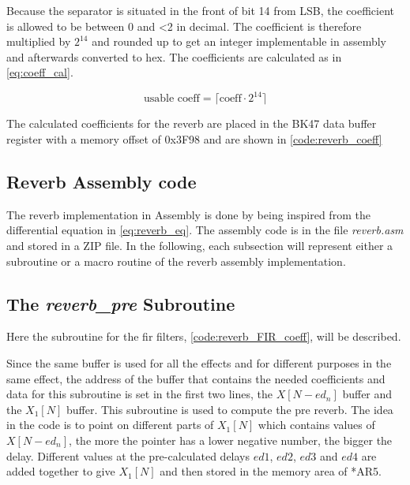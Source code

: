 Because the separator is situated in the front of bit 14 from LSB, the coefficient is allowed to be between 0 and <2 in decimal. The coefficient is therefore multiplied by $2^{14}$ and rounded up to get an integer implementable in assembly and afterwards converted to hex. The coefficients are calculated as in \autoref{eq:coeff_cal}.

    \begin{equation}\label{eq:coeff_cal}
\text{usable coeff} = \lceil\text{coeff} \cdot 2^{14}\rceil
    \end{equation}

The calculated coefficients for the \gls{reverb} are placed in the BK47 data buffer register with a memory offset of 0x3F98 and are shown in \autoref{code:reverb_coeff}



\subsection{Reverb Assembly code}
The reverb implementation in Assembly is done by being inspired from the differential equation in \autoref{eq:reverb_eq}. The assembly code is in the file \textit{reverb.asm} and stored in a ZIP file. In the following, each subsection will represent either a subroutine or a macro routine of the reverb assembly implementation. 

\subsection{The \textit{reverb_pre} Subroutine}
Here the subroutine for the \gls{fir} filters, \autoref{code:reverb_FIR_coeff}, will be described.


Since the same buffer is used for all the effects and for different purposes in the same effect, the address of the buffer that contains the needed coefficients and data for this subroutine is set in the first two lines, the $X[N-ed_{n}]$ buffer and the $X_1[N]$ buffer. This subroutine is used to compute the pre \gls{reverb}. The idea in the code is to point on different parts of $X_1[N]$ which contains values of $X[N-ed_n]$, the more the pointer has a lower negative number, the bigger the delay. Different values at the pre-calculated delays $ed1$, $ed2$, $ed3$ and $ed4$ are added together to give $X_{1}[N]$ and then stored in the memory area of  *AR5. \\

